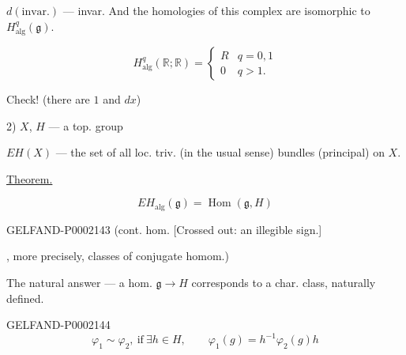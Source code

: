 $d (\text{invar.})$ --- invar. And the homologies of this complex are isomorphic to $H_{\mathrm{alg}}^q (\mathfrak g)$.



\begin{samepage}
\begin{equation*}H_{\mathrm{alg}}^q (\mathbb R;\mathbb R)=\begin{cases}R&q=0,1\\0&q>1.\end{cases}\end{equation*}



Check! (there are $1$ and $dx$)
\end{samepage}



2) $X$, $H$ --- a top. group



$EH (X)$ --- the set of all loc. triv. (in the usual sense) bundles (principal) on $X$.






\underline{Theorem.}



\begin{equation*}EH_{\mathrm{alg}}(\mathfrak g)=\operatorname{Hom}(\mathfrak g, H)\end{equation*}



\begin{GelfandAdjacentEvidence}{GELFAND-P000214}{3}
(cont. hom. [Crossed out: an illegible sign.]
\end{GelfandAdjacentEvidence}

, more precisely, classes of conjugate homom.)



The natural answer --- a hom. $\mathfrak g\longrightarrow H$ corresponds to a char. class, naturally defined.



\begin{GelfandAdjacentEvidence}{GELFAND-P000214}{4}
\begin{equation*}\varphi_1\sim\varphi_2,\ \text{if}\ \exists h\in H,\qquad\varphi_1(g)=h^{-1}\varphi_2(g)h\end{equation*}
\end{GelfandAdjacentEvidence}



